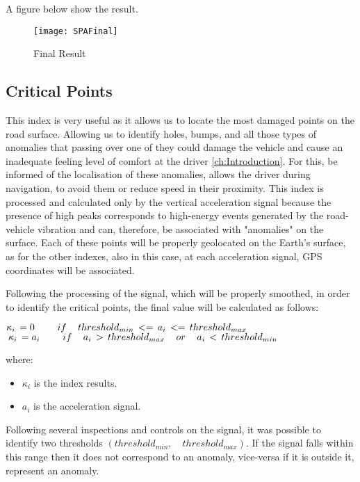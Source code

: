 \documentclass[tesi]{subfiles}
\begin{document}
\begin{description}
A figure below show the result.
\begin{figure}[H]
\centering
\texttt{[image: SPAFinal]}
\caption{Final Result}
\end{figure}\label{fig:Simple Accelerations Points Final Result}
\end{description}


\subsection{Critical Points}\label{ssc:Critical Points}
This index is very useful as it allows us to locate the most damaged points on the road surface.
Allowing us to identify holes, bumps, and all those types of anomalies that passing over one of they could damage the vehicle and cause an inadequate feeling level of comfort at the driver \ref{ch:Introduction}.
For this, be informed of the localisation of these anomalies,  allows the driver during navigation, to avoid them or reduce speed in their proximity.
This index is processed and calculated only by the vertical acceleration signal because the presence of high peaks corresponds to high-energy events generated by the road-vehicle vibration and can, therefore, be associated with "anomalies" on the surface.
Each of these points will be properly geolocated on the Earth's surface, as for the other indexes, also in this case, at each acceleration signal, GPS coordinates will be associated.	

Following the processing of the signal, which will be properly smoothed, in order to identify the critical points, the final value will be calculated as follows:

\begin{center}
${\large \kappa_{i} \thinspace = 0 \qquad	if \quad	threshold_{min} \thinspace <= \thinspace a_{i} \thinspace <= \thinspace threshold_{max}}$\\

${\large \thinspace \kappa_{i} \thinspace = a_{i} \qquad if \quad a_{i} \thinspace > \thinspace threshold_{max} \quad or \quad a_{i} \thinspace < \thinspace threshold_{min}}$
\end{center}

where:
\begin{itemize}
\item $\kappa_{i}$ is the index results.
\item $a_{i}$ is the acceleration signal.
\end{itemize} 
Following several inspections and controls on the signal, it was possible to identify two thresholds $\left(threshold_{min},\quad threshold_{max}\right)$.
If the signal falls within this range then it does not correspond to an anomaly, vice-versa if it is outside it, represent an anomaly.
\end{document}
